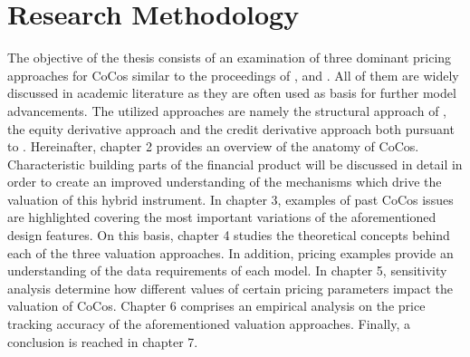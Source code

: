 \section{Research Methodology}
The objective of the thesis consists of an examination of three dominant pricing approaches for CoCos similar to the proceedings of \citet{alvemar2012modelling}, \citet{erismann2015pricing} and \citet{wilkens2014contingent}. All of them are widely discussed in academic literature as they are often used as basis for further model advancements. The utilized approaches are namely the structural approach of \citet{pennacchi2010structural}, the equity derivative approach and the credit derivative approach both pursuant to \citet{de2011pricing}. Hereinafter, chapter 2 provides an overview of the anatomy of CoCos. Characteristic building parts of the financial product will be discussed in detail in order to create an improved understanding of the mechanisms which drive the valuation of this hybrid instrument. In chapter 3, examples of past CoCos issues are highlighted covering the most important variations of the aforementioned design features. On this basis, chapter 4 studies the theoretical concepts behind each of the three valuation approaches. In addition, pricing examples provide an understanding of the data requirements of each model. In chapter 5, sensitivity analysis determine how different values of certain pricing parameters impact the valuation of CoCos. Chapter 6 comprises an empirical analysis on the price tracking accuracy of the aforementioned valuation approaches. Finally, a conclusion is reached in chapter 7.




